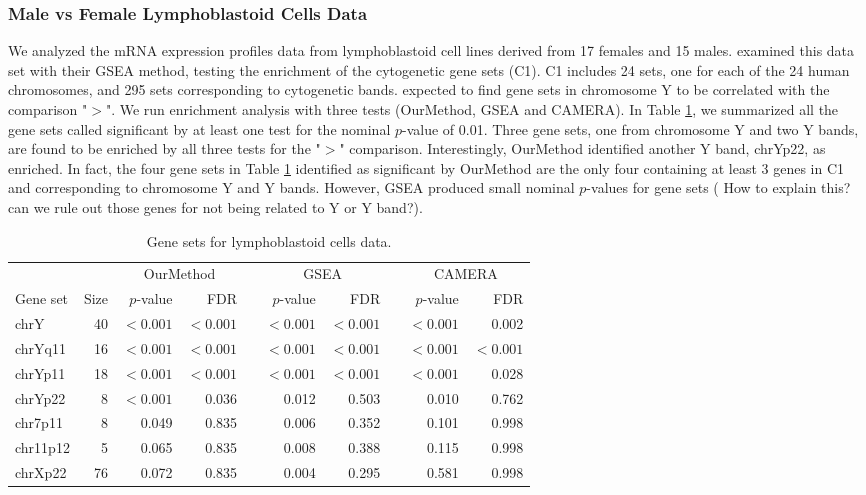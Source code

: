 \documentclass[11pt, a4paper]{article}
\begin{document}
		\subsubsection*{Male vs Female Lymphoblastoid Cells Data}
		We analyzed the mRNA expression profiles data from lymphoblastoid cell lines derived from 17 females and 15 males. \cite{subramanian2005gene} examined this data set with their GSEA method, testing the enrichment of the  cytogenetic gene sets (C1). C1 includes 24 sets, one for each of the 24 human chromosomes, and 295 sets corresponding to cytogenetic bands. \cite{subramanian2005gene} expected to find gene sets in chromosome Y to be correlated with the comparison "$>$". We run enrichment analysis with three tests (OurMethod, GSEA and CAMERA). In Table \ref{table:gender}, we summarized all the gene sets called significant by at least one test for the nominal $p$-value of 0.01. Three gene sets, one from chromosome Y and two Y bands, are found to be enriched by all three tests for the "$>$" comparison. Interestingly, OurMethod identified another Y band, chrYp22, as enriched. In fact, the four gene sets in Table \ref{table:gender} identified as significant by OurMethod are the only four containing at least 3 genes in C1 and corresponding to chromosome Y and Y bands. However, GSEA produced small nominal $p$-values for gene sets ( How to explain this? can we rule out those genes for not being related to Y or Y band?).
		
		\begin{table}[ht]
			\centering
			\caption{Gene sets for lymphoblastoid cells data.}
		\begin{tabular}{lrrr c rr c rr} \hline\hline 
		 & &  \multicolumn{2}{c}{OurMethod} & & \multicolumn{2}{c}{GSEA}	& & \multicolumn{2}{c}{CAMERA} \\	
		 \cline{3-4}  \cline{6-7} \cline{9-10}
		Gene set & Size & $p$-value & FDR & & $p$-value & FDR & &$p$-value & FDR \\ 
		\hline
		chrY & 40 & $<0.001$ & $<0.001$ & &$<0.001$ & $<0.001$ & & $<0.001$ & 0.002 \\ 
		chrYq11 & 16 & $<0.001$ & $<0.001$& & $<0.001$ & $<0.001$ & & $<0.001$ & $<0.001$ \\ 
		chrYp11 & 18 & $<0.001$ & $<0.001$ & & $<0.001$ & $<0.001$& & $<0.001$ & 0.028 \\ 
		chrYp22 & 8 & $<0.001$ & 0.036& & 0.012 & 0.503 & & 0.010 & 0.762 \\ 
		chr7p11 & 8 & 0.049 & 0.835 & & 0.006 & 0.352 & & 0.101 & 0.998 \\ 
		chr11p12 & 5 & 0.065 & 0.835& & 0.008 & 0.388 & & 0.115 & 0.998 \\ 
		chrXp22 & 76 & 0.072 & 0.835& & 0.004 & 0.295 & & 0.581 & 0.998 \\  
		\hline\hline
			\end{tabular}
			\label{table:gender}
		\end{table}
		
\end{document}
